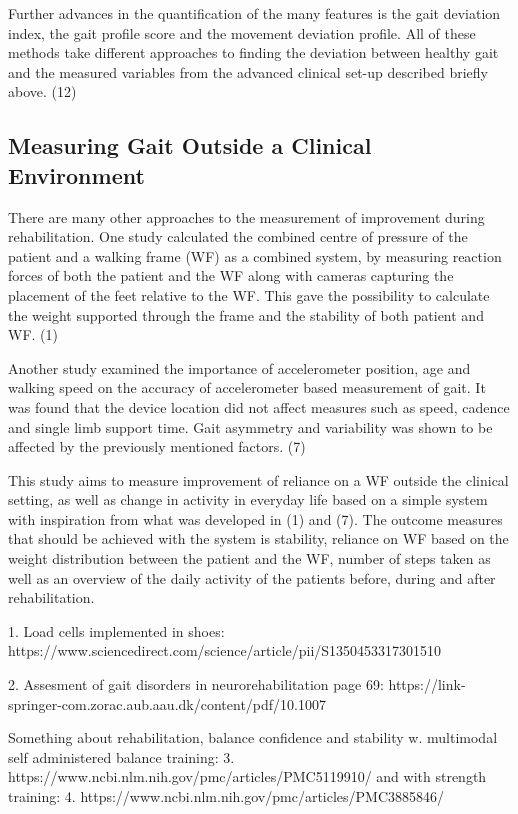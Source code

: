 Further advances in the quantification of the many features is the gait deviation index, the gait profile score and the movement deviation profile. All of these methods take different approaches to finding the deviation between healthy gait and the measured variables from the advanced clinical set-up described briefly above. (12)

\subsection{Measuring Gait Outside a Clinical Environment}

There are many other approaches to the measurement of improvement during rehabilitation. One study calculated the combined centre of pressure of the patient and a walking frame (WF) as a combined system, by measuring reaction forces of both the patient and the WF along with cameras capturing the placement of the feet relative to the WF. This gave the possibility to calculate the weight supported through the frame and the stability of both patient and WF. (1)

Another study examined the importance of accelerometer position, age and walking speed on the accuracy of accelerometer based measurement of gait. It was found that the device location did not affect measures such as speed, cadence and single limb support time. Gait asymmetry and variability was shown to be affected by the previously mentioned factors. (7)

This study aims to measure improvement of reliance on a WF outside the clinical setting, as well as change in activity in everyday life based on a simple system with inspiration from what was developed in (1) and (7). The outcome measures that should be achieved with the system is stability, reliance on WF based on the weight distribution between the patient and the WF, number of steps taken as well as an overview of the daily activity of the patients before, during and after rehabilitation.


1. Load cells implemented in shoes: https://www.sciencedirect.com/science/article/pii/S1350453317301510

2. Assesment of gait disorders in neurorehabilitation page 69:
https://link-springer-com.zorac.aub.aau.dk/content/pdf/10.1007%

Something about rehabilitation, balance confidence and stability w. multimodal self administered balance training: 3. https://www.ncbi.nlm.nih.gov/pmc/articles/PMC5119910/ 
and with strength training: 4. https://www.ncbi.nlm.nih.gov/pmc/articles/PMC3885846/ 

